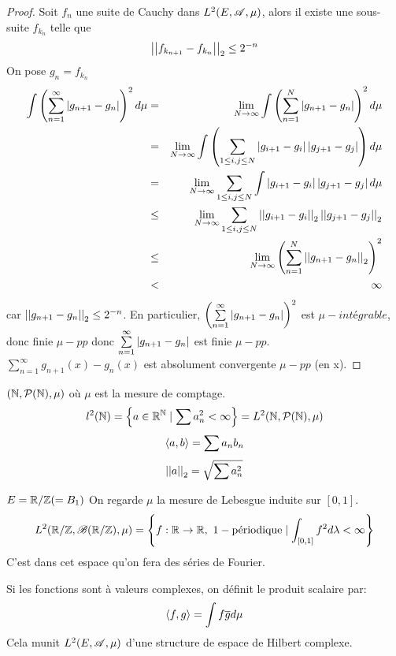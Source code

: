 \begin{proof}
	Soit $f_n$ une suite de Cauchy dans $L^2(E, \mathscr{A}, \mu)$, alors il existe une sous-suite $f_{k_n}$ telle que
	$$\left|\left|f_{k_{n+1}} - f_{k_n}\right|\right|_2 \leq 2^{-n}$$
	On pose $g_n = f_{k_n}$
	\begin{eqnarray*}
		\int \left( \sum\limits_{n=1}^\infty \left|g_{n+1} - g_n\right| \right)^2 d \mu &=& \lim_{N \to \infty} \int \left( \sum\limits_{n=1}^N \left|g_{n+1} - g_n\right| \right)^2 d \mu \\
		&=& \lim_{N \to \infty} \int \left( \sum\limits_{1 \leq i, j \leq N} \left|g_{i+1} - g_i\right| \left|g_{j+1} - g_j\right| \right) d \mu \\
		&=& \lim_{N \to \infty}   \sum\limits_{1 \leq i, j \leq N} \int\left|g_{i+1} - g_i\right| \left|g_{j+1} - g_j\right|  d \mu \\
		&\leq& \lim_{N \to \infty} \sum\limits_{1 \leq i, j \leq N} \left|\left|g_{i+1} - g_i\right|\right|_2 \left|\left|g_{j+1} - g_j\right|\right|_2 \\
		&\leq& \lim_{N \to \infty} \left( \sum\limits_{n=1}^N \left|\left|g_{n+1} - g_n\right|\right|_2 \right)^2 \\
		&<& \infty
	\end{eqnarray*}
car $\left|\left|g_{n+1} - g_n\right|\right|_2 \leq 2^{-n}$.
En particulier, $\left( \sum\limits_{n=1}^\infty \left|g_{n+1} - g_n\right| \right)^2$ est $\mu-intégrable$, donc finie $\mu-pp$ donc $ \sum\limits_{n=1}^\infty \left|g_{n+1} - g_n\right| $ est finie $\mu-pp$.
$ \sum\limits_{n=1}^\infty g_{n+1}(x) - g_n(x)$ est absolument convergente $\mu-pp$ (en x).
\end{proof}

\begin{example}
	$(\mathbb{N}, \mathcal{P}(\mathbb{N}), \mu)$ où $\mu$ est la mesure de comptage.
	$$l^2(\mathbb{N}) = \left\{ a \in \mathbb{R}^{\mathbb{N}} \mid \sum a_n^2 < \infty\right\} = L^2(\mathbb{N}, \mathcal{P}(\mathbb{N}), \mu)$$
	$$\left\langle a, b \right\rangle = \sum a_n b_n$$
	$$\left|\left|a\right|\right|_2 = \sqrt{\sum a_n^2}$$
\end{example}

\begin{example}
	$ E = \mathbb{R}/\mathbb{Z} ( = B_1)$
	On regarde $\mu$ la mesure de Lebesgue induite sur $[0,1]$.
	$$ L^2(\mathbb{R}/\mathbb{Z}, \mathscr{B} (\mathbb{R}/\mathbb{Z}), \mu) = \left\{ f: \mathbb{R} \to \mathbb{R}, \  1-\text{périodique} \mid \int_{[0,1]} f^2 d\lambda < \infty \right\} $$
	C'est dans cet espace qu'on fera des séries de Fourier.
\end{example}

\begin{remarque}
	Si les fonctions sont à valeurs complexes, on définit le produit scalaire par:
	$$\left\langle f, g \right\rangle = \int f \overline{g} d \mu$$
	Cela munit $L^2(E, \mathscr{A}, \mu)$ d'une structure de espace de Hilbert complexe.
\end{remarque}
